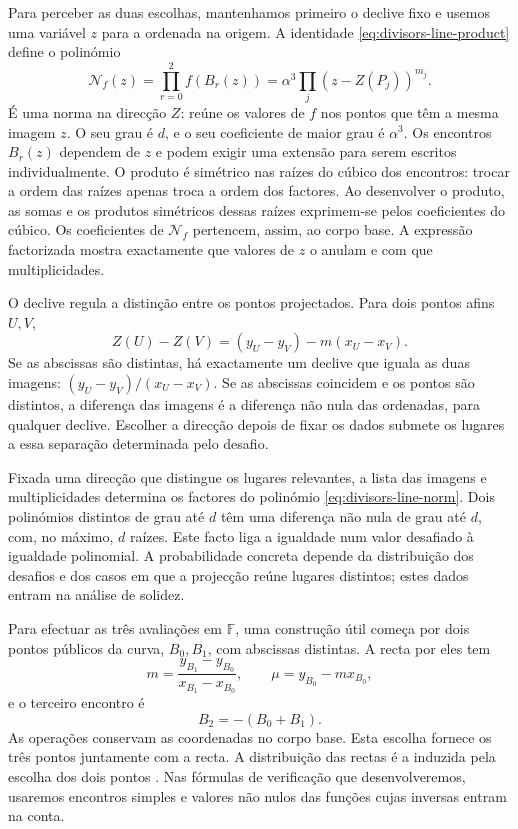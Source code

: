 Para perceber as duas escolhas, mantenhamos primeiro o declive fixo
e usemos uma variável \(z\) para a ordenada na origem. A identidade
\eqref{eq:divisors-line-product} define o polinómio
\begin{equation}
 \mathcal N_f(z)=\prod_{r=0}^2 f(B_r(z))
      =\alpha^3\prod_j(z-Z(P_j))^{m_j}.
 \label{eq:divisors-line-norm}
\end{equation}
É uma norma na direcção \(Z\): reúne os valores de \(f\)
nos pontos que têm a mesma imagem \(z\). O seu grau é \(d\),
e o seu coeficiente de maior grau é \(\alpha^3\). Os encontros
\(B_r(z)\) dependem de \(z\) e podem exigir uma extensão para
serem escritos individualmente. O produto é simétrico nas raízes
do cúbico dos encontros: trocar a ordem das raízes apenas troca a
ordem dos factores. Ao desenvolver o produto, as somas e os produtos
simétricos dessas raízes exprimem-se pelos coeficientes do cúbico.
Os coeficientes de \(\mathcal N_f\) pertencem, assim, ao corpo
base. A expressão factorizada mostra exactamente que valores de
\(z\) o anulam e com que multiplicidades.

O declive regula a distinção entre os pontos projectados. Para dois
pontos afins \(U,V\),
\[
 Z(U)-Z(V)=(y_U-y_V)-m(x_U-x_V).
\]
Se as abscissas são distintas, há exactamente um declive que iguala
as duas imagens: \((y_U-y_V)/(x_U-x_V)\). Se as abscissas
coincidem e os pontos são distintos, a diferença das imagens é a
diferença não nula das ordenadas, para qualquer declive. Escolher a
direcção depois de fixar os dados submete os lugares a essa
separação determinada pelo desafio.

Fixada uma direcção que distingue os lugares relevantes, a lista
das imagens e multiplicidades determina os factores do polinómio
\eqref{eq:divisors-line-norm}. Dois polinómios distintos de grau
até \(d\) têm uma diferença não nula de grau até \(d\), com,
no máximo, \(d\) raízes. Este facto liga a igualdade num valor
desafiado à igualdade polinomial. A probabilidade concreta depende
da distribuição dos desafios e dos casos em que a projecção reúne
lugares distintos; estes dados entram na análise de solidez.

Para efectuar as três avaliações em \(\mathbb F\), uma
construção útil começa por dois pontos públicos da curva,
\(B_0,B_1\), com abscissas distintas. A recta por eles tem
\[
 m=\frac{y_{B_1}-y_{B_0}}{x_{B_1}-x_{B_0}},
 \qquad \mu=y_{B_0}-mx_{B_0},
\]
e o terceiro encontro é
\[
 B_2=-(B_0+B_1).
\]
As operações conservam as coordenadas no corpo base. Esta escolha
fornece os três pontos juntamente com a recta. A distribuição das
rectas é a induzida pela escolha dos dois pontos
\cite{eagen-divisors,monero-oxide-fcmp-source}. Nas fórmulas de
verificação que desenvolveremos, usaremos encontros simples e valores
não nulos das funções cujas inversas entram na conta.

